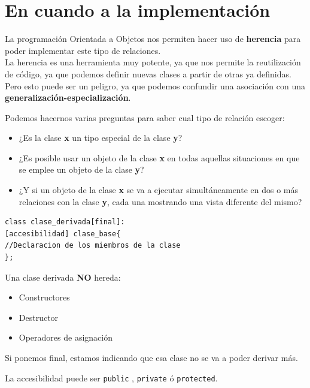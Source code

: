 \section{En cuando a la implementación}
La programación Orientada a Objetos nos permiten hacer uso de \textbf{herencia} para poder implementar este tipo de relaciones.\\
La herencia es una herramienta muy potente, ya que nos permite la reutilización de código, ya que podemos definir nuevas clases a partir de otras ya definidas.\\
Pero esto puede ser un peligro, ya que podemos confundir una asociación con una \textbf{generalización-especialización}.

Podemos hacernos varias preguntas para saber cual tipo de relación escoger:
\begin{itemize}
	\item ¿Es la clase \textbf{x} un tipo especial de la clase \textbf{y}?
	\item ¿Es posible usar un objeto de la clase \textbf{x} en todas aquellas situaciones en que se emplee un objeto de la clase \textbf{y}?
	\item ¿Y si un objeto de la clase \textbf{x} se va a ejecutar simultáneamente en dos o más relaciones con la clase \textbf{y}, cada una mostrando una vista diferente del mismo?
\end{itemize}

\begin{minipage}[t]{0.5\textwidth}
	\begin{lstlisting}[frame=single]
class clase_derivada[final]:
[accesibilidad] clase_base{
//Declaracion de los miembros de la clase
};
	\end{lstlisting}
\end{minipage}
\hfill
\begin{minipage}[t]{0.45\textwidth}
\vspace{-0.05cm}
Una clase derivada \textbf{NO} hereda:
	\begin{itemize}
		\item Constructores
		\item Destructor
		\item Operadores de asignación
	\end{itemize}
\end{minipage}

Si ponemos final, estamos indicando que esa clase no se va a poder derivar más.

La accesibilidad puede ser \texttt{public} , \texttt{private} ó \texttt{protected}.

